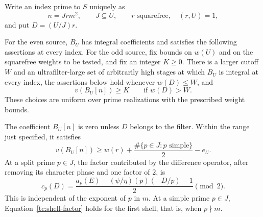 \begin{lemma}
\label{tc:shell-bound}
Write an index prime to $S$ uniquely as
\[
             n=Jr m^2,
 \qquad J\subseteq U,
 \qquad r\text{ squarefree},\quad (r,U)=1,
\]
and put $D=(U/J)r$.

For the even source, $B_U$ has integral coefficients and satisfies the
following assertions at every index. For the odd source, fix bounds on
$w(U)$ and on the squarefree weights to be tested, and fix an integer
$K\ge0$. There is a larger cutoff $W$ and an ultrafilter-large set of
arbitrarily high stages at which $B_U$ is integral at every index, the
assertions below hold whenever $w(D)\le W$, and
\[
                  v(B_U[n])\ge K\qquad\text{if }w(D)>W.
\]
These choices are uniform over prime realizations with the prescribed
weight bounds.

The coefficient $B_U[n]$ is zero unless $D$ belongs to the filter.
Within the range just specified, it satisfies
\begin{equation}
 v(B_U[n])\geq
       w(r)+\frac{\#\{p\in J:p\text{ simple}\}}2-e_U.
 \label{tc:coefficient-bound}
\end{equation}
At a split prime $p\in J$, the factor contributed by the difference
operator, after removing its character phase and one factor of $2$, is
\begin{equation}
 c_p(D)=
 \frac{a_p(E)-(\psi/\eta)(p)(-D/p)-1}{2}\pmod 2.
 \label{tc:shell-factor}
\end{equation}
This is independent of the exponent of $p$ in $m$. At a simple prime
$p\in J$, Equation~\eqref{tc:shell-factor} holds for the first shell,
that is, when $p\nmid m$.
\end{lemma}

